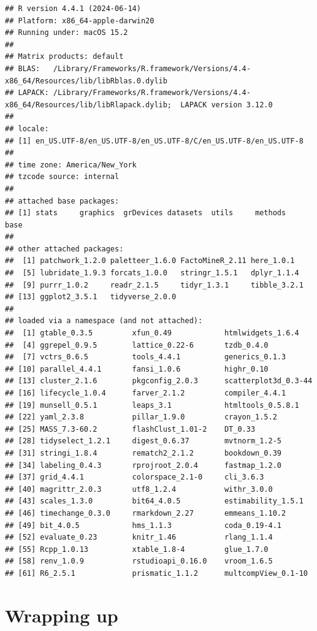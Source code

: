 \documentclass[
]{book}
\begin{document}
\begin{verbatim}
## R version 4.4.1 (2024-06-14)
## Platform: x86_64-apple-darwin20
## Running under: macOS 15.2
## 
## Matrix products: default
## BLAS:   /Library/Frameworks/R.framework/Versions/4.4-x86_64/Resources/lib/libRblas.0.dylib 
## LAPACK: /Library/Frameworks/R.framework/Versions/4.4-x86_64/Resources/lib/libRlapack.dylib;  LAPACK version 3.12.0
## 
## locale:
## [1] en_US.UTF-8/en_US.UTF-8/en_US.UTF-8/C/en_US.UTF-8/en_US.UTF-8
## 
## time zone: America/New_York
## tzcode source: internal
## 
## attached base packages:
## [1] stats     graphics  grDevices datasets  utils     methods   base     
## 
## other attached packages:
##  [1] patchwork_1.2.0 paletteer_1.6.0 FactoMineR_2.11 here_1.0.1     
##  [5] lubridate_1.9.3 forcats_1.0.0   stringr_1.5.1   dplyr_1.1.4    
##  [9] purrr_1.0.2     readr_2.1.5     tidyr_1.3.1     tibble_3.2.1   
## [13] ggplot2_3.5.1   tidyverse_2.0.0
## 
## loaded via a namespace (and not attached):
##  [1] gtable_0.3.5         xfun_0.49            htmlwidgets_1.6.4   
##  [4] ggrepel_0.9.5        lattice_0.22-6       tzdb_0.4.0          
##  [7] vctrs_0.6.5          tools_4.4.1          generics_0.1.3      
## [10] parallel_4.4.1       fansi_1.0.6          highr_0.10          
## [13] cluster_2.1.6        pkgconfig_2.0.3      scatterplot3d_0.3-44
## [16] lifecycle_1.0.4      farver_2.1.2         compiler_4.4.1      
## [19] munsell_0.5.1        leaps_3.1            htmltools_0.5.8.1   
## [22] yaml_2.3.8           pillar_1.9.0         crayon_1.5.2        
## [25] MASS_7.3-60.2        flashClust_1.01-2    DT_0.33             
## [28] tidyselect_1.2.1     digest_0.6.37        mvtnorm_1.2-5       
## [31] stringi_1.8.4        rematch2_2.1.2       bookdown_0.39       
## [34] labeling_0.4.3       rprojroot_2.0.4      fastmap_1.2.0       
## [37] grid_4.4.1           colorspace_2.1-0     cli_3.6.3           
## [40] magrittr_2.0.3       utf8_1.2.4           withr_3.0.0         
## [43] scales_1.3.0         bit64_4.0.5          estimability_1.5.1  
## [46] timechange_0.3.0     rmarkdown_2.27       emmeans_1.10.2      
## [49] bit_4.0.5            hms_1.1.3            coda_0.19-4.1       
## [52] evaluate_0.23        knitr_1.46           rlang_1.1.4         
## [55] Rcpp_1.0.13          xtable_1.8-4         glue_1.7.0          
## [58] renv_1.0.9           rstudioapi_0.16.0    vroom_1.6.5         
## [61] R6_2.5.1             prismatic_1.1.2      multcompView_0.1-10
\end{verbatim}

\chapter{Wrapping up}\label{wrapping-up-1}
\end{document}
